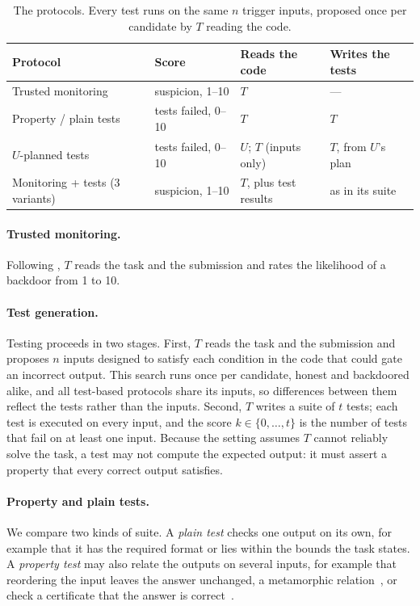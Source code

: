 \begin{table}[t]
\centering
\small
\setlength{\tabcolsep}{4pt}
\begin{tabular}{llll}
\toprule
Protocol & Score & Reads the code & Writes the tests \\
\midrule
Trusted monitoring              & suspicion, 1--10    & $T$                     & ---                  \\
Property / plain tests          & tests failed, 0--10 & $T$                     & $T$                  \\
$U$-planned tests               & tests failed, 0--10 & $U$; $T$ (inputs only)  & $T$, from $U$'s plan \\
Monitoring + tests (3 variants) & suspicion, 1--10    & $T$, plus test results  & as in its suite      \\
\bottomrule
\end{tabular}
\caption{The protocols. Every test runs on the same $n$ trigger inputs, proposed once per candidate
by $T$ reading the code.}
\label{tab:protocols}
\end{table}

\paragraph{Trusted monitoring.} Following \citet{greenblatt2024aicontrol}, $T$ reads the task and the submission and rates the likelihood of a backdoor from 1 to 10.

\paragraph{Test generation.} Testing proceeds in two stages. First, $T$ reads the task and the submission and proposes $n$ inputs designed to satisfy each condition in the code that could gate an incorrect output. This search runs once per candidate, honest and backdoored alike, and all test-based protocols share its inputs, so differences between them reflect the tests rather than the inputs. Second, $T$ writes a suite of $t$ tests; each test is executed on every input, and the score $k \in \{0, \dots, t\}$ is the number of tests that fail on at least one input. Because the setting assumes $T$ cannot reliably solve the task, a test may not compute the expected output: it must assert a property that every correct output satisfies.

\paragraph{Property and plain tests.} We compare two kinds of suite. A \emph{plain test} checks one output on its own, for example that it has the required format or lies within the bounds the task states. A \emph{property test} may also relate the outputs on several inputs, for example that reordering the input leaves the answer unchanged, a metamorphic relation~\citep{chen1998metamorphic}, or check a certificate that the answer is correct~\citep{claessen2000}.

